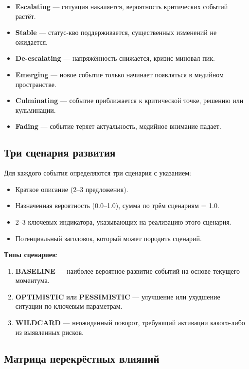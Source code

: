 \begin{itemize}
    \item \textbf{Escalating} — ситуация накаляется, вероятность критических событий растёт.
    \item \textbf{Stable} — статус-кво поддерживается, существенных изменений не ожидается.
    \item \textbf{De-escalating} — напряжённость снижается, кризис миновал пик.
    \item \textbf{Emerging} — новое событие только начинает появляться в медийном пространстве.
    \item \textbf{Culminating} — событие приближается к критической точке, решению или кульминации.
    \item \textbf{Fading} — событие теряет актуальность, медийное внимание падает.
\end{itemize}

\subsection{Три сценария развития}

Для каждого события определяются три сценария с указанием:
\begin{itemize}
    \item Краткое описание (2–3 предложения).
    \item Назначенная вероятность (0.0–1.0), сумма по трём сценариям = 1.0.
    \item 2–3 ключевых индикатора, указывающих на реализацию этого сценария.
    \item Потенциальный заголовок, который может породить сценарий.
\end{itemize}

\textbf{Типы сценариев}:
\begin{enumerate}
    \item \textbf{BASELINE} — наиболее вероятное развитие событий на основе текущего моментума.
    \item \textbf{OPTIMISTIC} или \textbf{PESSIMISTIC} — улучшение или ухудшение ситуации по ключевым параметрам.
    \item \textbf{WILDCARD} — неожиданный поворот, требующий активации какого-либо из выявленных рисков.
\end{enumerate}

\subsection{Матрица перекрёстных влияний}

